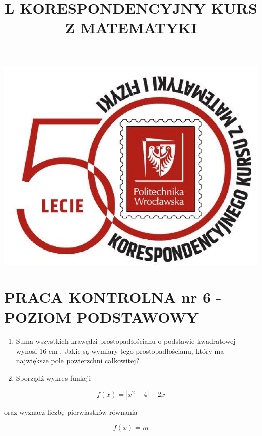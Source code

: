 \documentclass[10pt]{article}
\title{L KORESPONDENCYJNY KURS Z MATEMATYKI }
\author{}
\date{}
\begin{document}
\maketitle
\begin{center}
\includegraphics[max width=\textwidth]{2024_11_16_15fbc1d9eedef443db8ag-1}
\end{center}

\section*{PRACA KONTROLNA nr 6 - POZIOM PODSTAWOWY}
\begin{enumerate}
  \item Suma wszystkich krawędzi prostopadłościanu o podstawie kwadratowej wynosi 16 cm . Jakie są wymiary tego prostopadłościanu, który ma największe pole powierzchni całkowitej?
  \item Sporządź wykres funkcji
\end{enumerate}

$$
f(x)=\left|x^{2}-4\right|-2 x
$$

oraz wyznacz liczbę pierwiastków równania

$$
f(x)=m
$$
\end{document}
